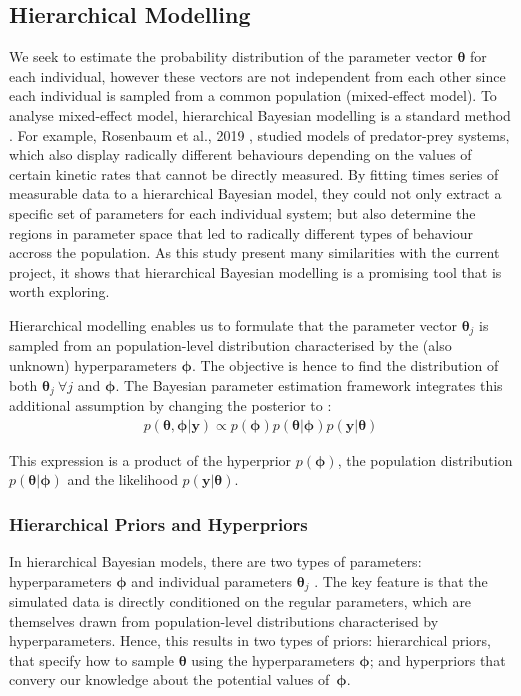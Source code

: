 \documentclass[11pt]{article}
\begin{document}
\subsection{Hierarchical Modelling}
We seek to estimate the probability distribution of the parameter vector $\boldsymbol{\theta}$ for each individual, however these vectors are not independent from each other since each individual is sampled from a common population (mixed-effect model). To analyse mixed-effect model, hierarchical Bayesian modelling is a standard method \cite{revParamEst}\cite{rosenbaum}. For example, Rosenbaum et al., 2019 \cite{rosenbaum}, studied models of predator-prey systems, which also display radically different behaviours depending on the values of certain kinetic rates that cannot be directly measured. By fitting times series of measurable data to a hierarchical Bayesian model, they could not only extract a specific set of parameters for each individual system; but also determine the regions in parameter space that led to radically different types of behaviour accross the population. As this study present many similarities with the current project, it shows that hierarchical Bayesian modelling is a promising tool that is worth exploring.

Hierarchical modelling enables us to formulate that the parameter vector $\boldsymbol{\theta}_j$ is sampled from an population-level distribution characterised by the (also unknown) hyperparameters $\boldsymbol{\phi}$. The objective is hence to find the distribution of both $\boldsymbol{\theta}_j~\forall j$ and $\boldsymbol{\phi}$. The Bayesian parameter estimation framework integrates this additional assumption by changing the posterior to \cite{tbk_gelman}:
\begin{align*}
    p(\boldsymbol{\theta}, \boldsymbol{\phi} | \boldsymbol{y}) \propto p(\boldsymbol{\phi})p(\boldsymbol{\theta}|\boldsymbol{\phi})p(\boldsymbol{y}|\boldsymbol{\theta})
\end{align*} 

This expression is a product of the hyperprior $p(\boldsymbol{\phi})$, the population distribution $p(\boldsymbol{\theta}|\boldsymbol{\phi})$ and the likelihood $p(\boldsymbol{y}|\boldsymbol{\theta})$.

\subsubsection{Hierarchical Priors and Hyperpriors}
In hierarchical Bayesian models, there are two types of parameters: hyperparameters $\boldsymbol{\phi}$ and individual parameters $\boldsymbol{\theta}_j$ \cite{tbk_gelman}. The key feature is that the simulated data is directly conditioned on the regular parameters, which are themselves drawn from population-level distributions characterised by hyperparameters. Hence, this results in two types of priors: hierarchical priors, that specify how to sample $\boldsymbol{\theta}$ using the hyperparameters $\boldsymbol{\phi}$; and hyperpriors that convery our knowledge about the potential values of~$\boldsymbol{\phi}$.
\end{document}
